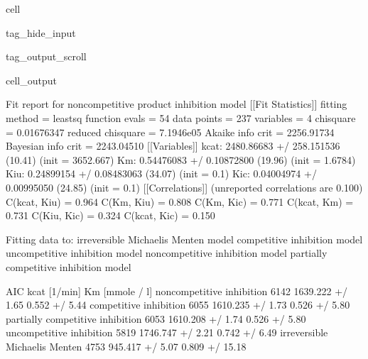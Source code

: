 \documentclass[letterpaper,10pt,english]{jupyterBook}
\begin{document}
\begin{sphinxuseclass}{cell}
\begin{sphinxuseclass}{tag_hide_input}
\begin{sphinxuseclass}{tag_output_scroll}
\begin{sphinxVerbatimOutput}
\begin{sphinxuseclass}{cell_output}
\begin{sphinxVerbatim}[commandchars=\\\{\}]
Fit report for non\PYGZhy{}competitive product inhibition model
[[Fit Statistics]]
    \PYGZsh{} fitting method   = leastsq
    \PYGZsh{} function evals   = 54
    \PYGZsh{} data points      = 237
    \PYGZsh{} variables        = 4
    chi\PYGZhy{}square         = 0.01676347
    reduced chi\PYGZhy{}square = 7.1946e\PYGZhy{}05
    Akaike info crit   = \PYGZhy{}2256.91734
    Bayesian info crit = \PYGZhy{}2243.04510
[[Variables]]
    k\PYGZus{}cat:  2480.86683 +/\PYGZhy{} 258.151536 (10.41\PYGZpc{}) (init = 3652.667)
    Km:     0.54476083 +/\PYGZhy{} 0.10872800 (19.96\PYGZpc{}) (init = 1.6784)
    K\PYGZus{}iu:   0.24899154 +/\PYGZhy{} 0.08483063 (34.07\PYGZpc{}) (init = 0.1)
    K\PYGZus{}ic:   0.04004974 +/\PYGZhy{} 0.00995050 (24.85\PYGZpc{}) (init = 0.1)
[[Correlations]] (unreported correlations are \PYGZlt{} 0.100)
    C(k\PYGZus{}cat, K\PYGZus{}iu) = \PYGZhy{}0.964
    C(Km, K\PYGZus{}iu)    = \PYGZhy{}0.808
    C(Km, K\PYGZus{}ic)    = 0.771
    C(k\PYGZus{}cat, Km)   = 0.731
    C(K\PYGZus{}iu, K\PYGZus{}ic)  = \PYGZhy{}0.324
    C(k\PYGZus{}cat, K\PYGZus{}ic) = 0.150
\end{sphinxVerbatim}

\noindent{}

\begin{sphinxVerbatim}[commandchars=\\\{\}]
Fitting data to:
 \PYGZhy{} irreversible Michaelis Menten model
 \PYGZhy{} competitive inhibition model
 \PYGZhy{} uncompetitive inhibition model
 \PYGZhy{} non\PYGZhy{}competitive inhibition model
 \PYGZhy{} partially competitive inhibition model
\end{sphinxVerbatim}

\begin{sphinxVerbatim}[commandchars=\\\{\}]
                                   AIC        kcat [1/min]    Km [mmole / l]  \PYGZbs{}
non\PYGZhy{}competitive inhibition       \PYGZhy{}6142  1639.222 +/\PYGZhy{} 1.65\PYGZpc{}   0.552 +/\PYGZhy{} 5.44\PYGZpc{}   
competitive inhibition           \PYGZhy{}6055  1610.235 +/\PYGZhy{} 1.73\PYGZpc{}   0.526 +/\PYGZhy{} 5.80\PYGZpc{}   
partially competitive inhibition \PYGZhy{}6053  1610.208 +/\PYGZhy{} 1.74\PYGZpc{}   0.526 +/\PYGZhy{} 5.80\PYGZpc{}   
uncompetitive inhibition         \PYGZhy{}5819  1746.747 +/\PYGZhy{} 2.21\PYGZpc{}   0.742 +/\PYGZhy{} 6.49\PYGZpc{}   
irreversible Michaelis Menten    \PYGZhy{}4753   945.417 +/\PYGZhy{} 5.07\PYGZpc{}  0.809 +/\PYGZhy{} 15.18\PYGZpc{}   


\end{sphinxVerbatim}
\end{sphinxuseclass}
\end{sphinxVerbatimOutput}
\end{sphinxuseclass}
\end{sphinxuseclass}
\end{sphinxuseclass}
\end{document}

